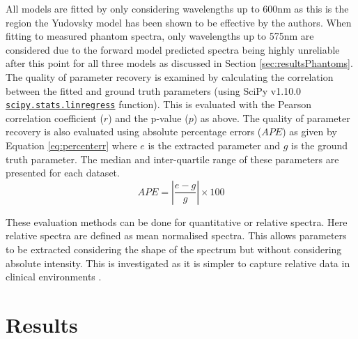 All models are fitted by only considering wavelengths up to 600nm as this is the region the Yudovsky model has been shown to be effective by the authors\cite{Yudovsky2011a}.
When fitting to measured phantom spectra, only wavelengths up to 575nm are considered due to the forward model predicted spectra being highly unreliable after this point for all three models as discussed in Section \ref{sec:resultsPhantoms}. The quality of parameter recovery is examined by calculating the correlation between the fitted and ground truth parameters (using SciPy v1.10.0 \href{https://docs.scipy.org/doc/scipy/reference/generated/scipy.stats.linregress.html}{\texttt{scipy.stats.linregress}} function). This is evaluated with the Pearson correlation coefficient ($r$) and the p-value ($p$) as above. The quality of parameter recovery is also evaluated using absolute percentage errors ($APE$) as given by Equation \eqref{eq:percenterr} where $e$ is the extracted parameter and $g$ is the ground truth parameter. The median and inter-quartile range of these parameters are presented for each dataset. 
\begin{equation}
    APE = |\frac{e - g}{g}| \times 100 
    \label{eq:percenterr}
\end{equation}

These evaluation methods can be done for quantitative or relative spectra. Here relative spectra are defined as mean normalised spectra. This allows parameters to be extracted considering the shape of the spectrum but without considering absolute intensity. This is investigated as it is simpler to capture relative data in clinical environments \cite{Bahl2023}.

\section{Results}\label{sec:results}
